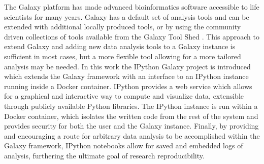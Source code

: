 \documentclass{bioinfo}
\begin{document}
The Galaxy platform \citep{Blank2010,Giardine2005,Goecks2010} has made advanced bioinformatics software accessible
to life scientists for many years. Galaxy has a default set of analysis tools and can be extended with additional locally produced tools, or by using the community driven collections of tools available from the Galaxy Tool Shed
\citep{Blankenberg2014}. This approach to extend Galaxy and adding new data analysis tools to a Galaxy instance is sufficient
in most cases, but a more flexible tool allowing for a more tailored analysis may be needed.
In this work the IPython Galaxy project is introduced which extends the Galaxy framework with an interface to an
IPython \citep{Perez2007} instance running inside a Docker container.
IPython provides a web service which allows for a graphical and interactive way to compute and visualize data, 
extensible through publicly available Python libraries. The IPython instance is run within a Docker container, 
which isolates the written code from the rest of the system and provides security for both the user and the Galaxy instance. Finally, by providing and encouraging a route for arbitrary data analysis to be accomplished within the Galaxy framework, 
IPython notebooks allow for saved and embedded logs of analysis, furthering the ultimate goal of research reproducibility.
\end{document}
